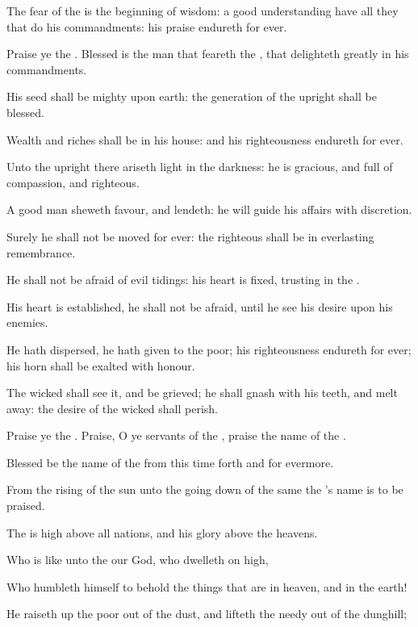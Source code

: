 \Verse The fear of the \LORD is the beginning of wisdom: a good understanding have all they that do his commandments: his praise endureth for ever.




\Chapter
\Verse Praise ye the \LORD. Blessed is the man that feareth the \LORD, that delighteth greatly in his commandments.

\Verse His seed shall be mighty upon earth: the generation of the upright shall be blessed.

\Verse Wealth and riches shall be in his house: and his righteousness endureth for ever.

\Verse Unto the upright there ariseth light in the darkness: he is gracious, and full of compassion, and righteous.

\Verse A good man sheweth favour, and lendeth: he will guide his affairs with discretion.

\Verse Surely he shall not be moved for ever: the righteous shall be in everlasting remembrance.

\Verse He shall not be afraid of evil tidings: his heart is fixed, trusting in the \LORD.

\Verse His heart is established, he shall not be afraid, until he see his desire upon his enemies.

\Verse He hath dispersed, he hath given to the poor; his righteousness endureth for ever; his horn shall be exalted with honour.

\Verse The wicked shall see it, and be grieved; he shall gnash with his teeth, and melt away: the desire of the wicked shall perish.




\Chapter
\Verse Praise ye the \LORD. Praise, O ye servants of the \LORD, praise the name of the \LORD.

\Verse Blessed be the name of the \LORD from this time forth and for evermore.

\Verse From the rising of the sun unto the going down of the same the \LORD's name is to be praised.

\Verse The \LORD is high above all nations, and his glory above the heavens.

\Verse Who is like unto the \LORD our God, who dwelleth on high,

\Verse Who humbleth himself to behold the things that are in heaven, and in the earth!

\Verse He raiseth up the poor out of the dust, and lifteth the needy out of the dunghill;

